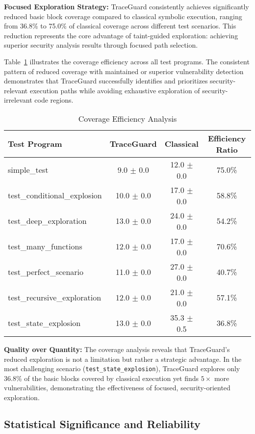 \textbf{Focused Exploration Strategy:} TraceGuard consistently achieves significantly reduced basic block coverage compared to classical symbolic execution, ranging from 36.8\% to 75.0\% of classical coverage across different test scenarios. This reduction represents the core advantage of taint-guided exploration: achieving superior security analysis results through focused path selection.

Table~\ref{tab:coverage_efficiency} illustrates the coverage efficiency across all test programs. The consistent pattern of reduced coverage with maintained or superior vulnerability detection demonstrates that TraceGuard successfully identifies and prioritizes security-relevant execution paths while avoiding exhaustive exploration of security-irrelevant code regions.

\begin{table}[htbp]
\centering
\caption{Coverage Efficiency Analysis}
\label{tab:coverage_efficiency}
\begin{tabular}{lccc}
\toprule
\textbf{Test Program} & \textbf{TraceGuard} & \textbf{Classical} & \textbf{Efficiency Ratio} \\
\midrule
simple\_test & 9.0 $\pm$ 0.0 & 12.0 $\pm$ 0.0 & 75.0\% \\
test\_conditional\_explosion & 10.0 $\pm$ 0.0 & 17.0 $\pm$ 0.0 & 58.8\% \\
test\_deep\_exploration & 13.0 $\pm$ 0.0 & 24.0 $\pm$ 0.0 & 54.2\% \\
test\_many\_functions & 12.0 $\pm$ 0.0 & 17.0 $\pm$ 0.0 & 70.6\% \\
test\_perfect\_scenario & 11.0 $\pm$ 0.0 & 27.0 $\pm$ 0.0 & 40.7\% \\
test\_recursive\_exploration & 12.0 $\pm$ 0.0 & 21.0 $\pm$ 0.0 & 57.1\% \\
test\_state\_explosion & 13.0 $\pm$ 0.0 & 35.3 $\pm$ 0.5 & 36.8\% \\
\bottomrule
\end{tabular}
\end{table}

\textbf{Quality over Quantity:} The coverage analysis reveals that TraceGuard's reduced exploration is not a limitation but rather a strategic advantage. In the most challenging scenario (\texttt{test\_state\_explosion}), TraceGuard explores only 36.8\% of the basic blocks covered by classical execution yet finds $5 \times$ more vulnerabilities, demonstrating the effectiveness of focused, security-oriented exploration.

\subsection{Statistical Significance and Reliability}

